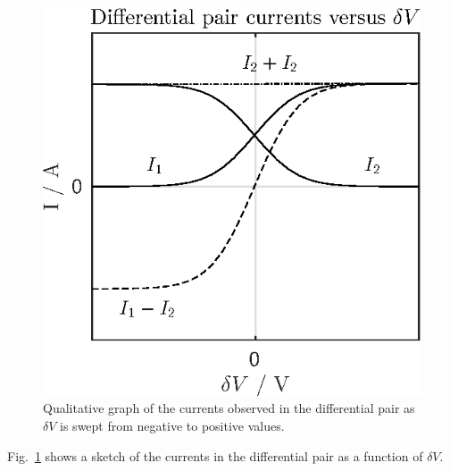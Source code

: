 \subsubsection{}
\begin{figure}
    \center
    \includegraphics{prelab2.eps}
    \caption{Qualitative graph of the currents observed in the differential pair as \(\delta V\) is swept from negative to positive values.}
    \label{fig:sketch2}
\end{figure}
Fig.~\ref{fig:sketch2} shows a sketch of the currents in the differential pair as a function of \(\delta V\).
